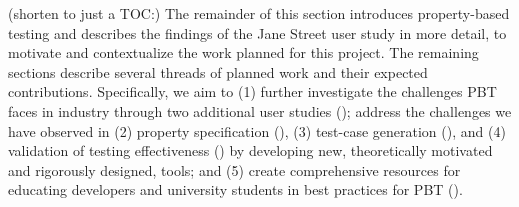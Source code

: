 (shorten to just a TOC:)
The remainder of this section introduces property-based testing and
describes the findings of the Jane Street user study in more detail,
to motivate and contextualize the work planned for this project.  The
remaining sections describe several threads of planned work and their
expected contributions.  Specifically, we aim to (1) further
investigate the challenges PBT faces in industry through
two\iflater{}\fi{}  additional user studies ();
address the challenges we have observed in (2) property specification
(), (3) test-case generation
(), and (4) validation of testing effectiveness
() by developing new, theoretically motivated and
rigorously designed, tools; and (5) create comprehensive resources for
educating developers and university students in best practices for PBT
().




